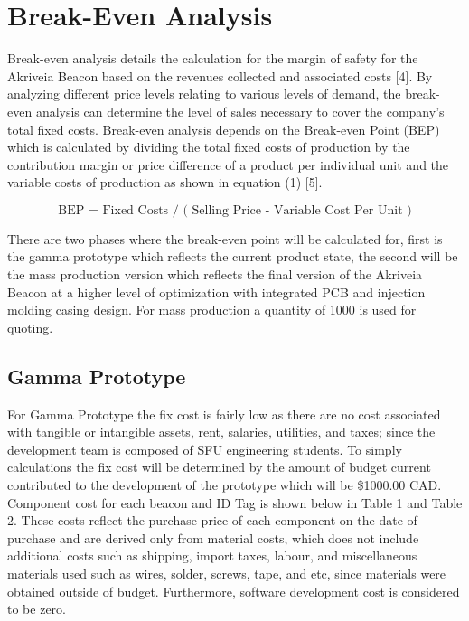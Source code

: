 

\setcounter{section}{1}
\section{Break-Even Analysis}

\bigskip
Break-even analysis details the calculation for the margin of safety for the Akriveia Beacon based on the revenues collected and associated costs [4]. By analyzing different price levels relating to various levels of demand, the break-even analysis can determine the level of sales necessary to cover the company's total fixed costs. Break-even analysis depends on the Break-even Point (BEP) which is calculated by dividing the total fixed costs of production by the contribution margin or price difference of a product per individual unit and the variable costs of production as shown in equation (1) [5]. 

\begin{equation}
	\text{BEP = Fixed Costs / ( Selling Price - Variable Cost Per Unit )}
\end{equation}

There are two phases where the break-even point will be calculated for, first is the gamma prototype which reflects the current product state, the second will be the mass production version which reflects the final version of the Akriveia Beacon at a higher level of optimization with integrated PCB and injection molding casing design. For mass production a quantity of 1000 is used for quoting.

\subsection{Gamma Prototype}

\medskip
For Gamma Prototype the fix cost is fairly low as there are no cost associated with tangible or intangible assets, rent, salaries, utilities, and taxes; since the development team is composed of SFU engineering students. To simply calculations the fix cost will be determined by the amount of budget current contributed to the development of the prototype which will be \$1000.00 CAD. Component cost for each beacon and ID Tag is shown below in Table 1 and Table 2. These costs reflect the purchase price of each component on the date of purchase and are derived only from material costs, which does not include additional costs such as shipping, import taxes, labour, and miscellaneous materials used such as wires, solder, screws, tape, and etc, since materials were obtained outside of budget. Furthermore, software development cost is considered to be zero.

